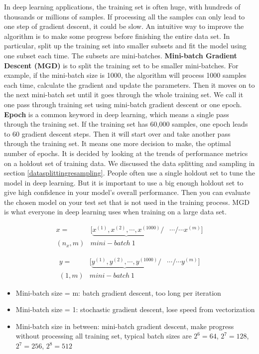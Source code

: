 \documentclass[12pt,]{krantz}
\providecommand{\tightlist}{%
  \setlength{\itemsep}{0pt}\setlength{\parskip}{0pt}}
\begin{document}
In deep learning applications, the training set is often huge, with hundreds of thousands or millions of samples. If processing all the samples can only lead to one step of gradient descent, it could be slow. An intuitive way to improve the algorithm is to make some progress before finishing the entire data set. In particular, split up the training set into smaller subsets and fit the model using one subset each time. The subsets are mini-batches. \textbf{Mini-batch Gradient Descent (MGD)} is to split the training set to be smaller mini-batches. For example, if the mini-batch size is 1000, the algorithm will process 1000 samples each time, calculate the gradient and update the parameters. Then it moves on to the next mini-batch set until it goes through the whole training set. We call it one pass through training set using mini-batch gradient descent or one epoch. \textbf{Epoch} is a common keyword in deep learning, which means a single pass through the training set. If the training set has 60,000 samples, one epoch leads to 60 gradient descent steps. Then it will start over and take another pass through the training set. It means one more decision to make, the optimal number of epochs. It is decided by looking at the trends of performance metrics on a holdout set of training data. We discussed the data splitting and sampling in section \ref{datasplittingresampling}. People often use a single holdout set to tune the model in deep learning. But it is important to use a big enough holdout set to give high confidence in your model's overall performance. Then you can evaluate the chosen model on your test set that is not used in the training process. MGD is what everyone in deep learning uses when training on a large data set.

\[\begin{array}{ccc} x= & [\underbrace{x^{(1)},x^{(2)},\cdots,x^{(1000)}}/ & \cdots/\cdots x^{(m)}]\\ (n_{x},m) & mini-batch\ 1 \end{array}\]

\[\begin{array}{ccc} y= & [\underbrace{y^{(1)},y^{(2)},\cdots,y^{(1000)}}/ & \cdots/\cdots y^{(m)}]\\ (1,m) & mini-batch\ 1 \end{array}\]

\begin{itemize}
\tightlist
\item
  Mini-batch size = m: batch gradient descent, too long per iteration
\item
  Mini-batch size = 1: stochastic gradient descent, lose speed from vectorization
\item
  Mini-batch size in between: mini-batch gradient descent, make progress without processing all training set, typical batch sizes are \(2^6=64\), \(2^7=128\), \(2^7=256\), \(2^8=512\)
\end{itemize}
\end{document}
